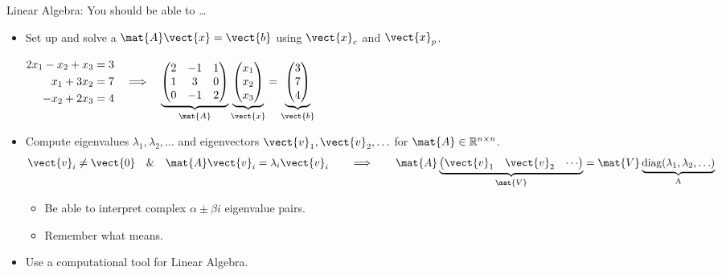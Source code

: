\begin{frame}{Linear Algebra: You should be able to \dots }
\begin{itemize}
  \item Set up and solve a 
   $\mat{A}\vect{x}=\vect{b}$ using $\vect{x}_c$ and $\vect{x}_p$.
 \par\hspace*{1em}$
    \begin{aligned}
      2x_1-x_2+x_3 &= 3\\
      x_1+3x_2 &= 7\\
      -x_2+2x_3 &= 4
    \end{aligned}
    \quad\Longrightarrow\quad
    \underbrace{\begin{pmatrix}
      2 & -1 & 1\\
      1 & 3 & 0\\
      0 & -1 & 2
    \end{pmatrix}}_{\mat{A}}
    \underbrace{\begin{pmatrix}x_1\\x_2\\x_3\end{pmatrix}}_{\vect{x}}
    =
    \underbrace{\begin{pmatrix}3\\7\\4\end{pmatrix}}_{\vect{b}}
  $
 
  \item Compute eigenvalues 
  $\lambda_1,\lambda_2,\ldots$ and eigenvectors $\vect{v}_1,\vect{v}_2,\ldots$
  for $\mat{A}\in\mathbb{R}^{n\times n}$.  
    \[
      \vect{v}_i\ne\vect{0}
      \quad \& \quad
      	\mat{A}\vect{v}_i=\lambda_i\vect{v}_i
      \qquad
      \Longrightarrow
      \qquad
      \mat{A}
      \underbrace{\begin{pmatrix}
        \vect{v}_1 & \vect{v}_2 & \cdots
      \end{pmatrix}}_{\mat{V}}
      =
      \mat{V}
      \underbrace{\operatorname{diag}(\lambda_1,\lambda_2,\ldots)}_{\Lambda}
    \]
    \begin{itemize}
    \item Be able to interpret complex 
    $\alpha \pm \beta i$ eigenvalue pairs.
    \item Remember what  means.
    \end{itemize}
    \item Use a computational tool for Linear Algebra.  
\end{itemize}
\end{frame}
